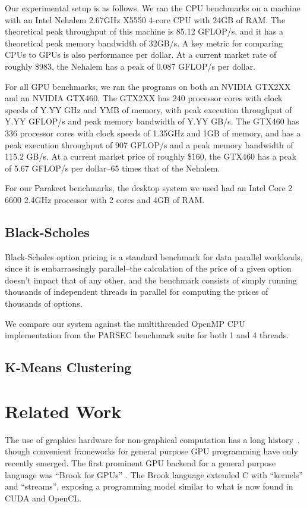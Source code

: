 \documentclass[preprint]{sigplanconf}
\begin{document}
Our experimental setup is as follows.  We ran the CPU benchmarks on a machine
with an Intel Nehalem 2.67GHz X5550 4-core CPU with 24GB of RAM.  The
theoretical peak throughput of this machine is 85.12 GFLOP/s, and it has a
theoretical peak memory bandwidth of 32GB/s.  A key metric for comparing CPUs
to GPUs is also performance per dollar.  At a current market rate of roughly
\$983, the Nehalem has a peak of 0.087 GFLOP/s per dollar.

For all GPU benchmarks, we ran the programs on both an NVIDIA GTX2XX and an
NVIDIA GTX460.  The GTX2XX has 240 processor cores with clock speeds of
Y.YY GHz and YMB of memory, with peak execution throughput of Y.YY GFLOP/s and
peak memory bandwidth of Y.YY GB/s.  The GTX460 has 336 processor cores with
clock speeds of 1.35GHz and 1GB of memory, and has a peak execution throughput
of 907 GFLOP/s and a peak memory bandwidth of 115.2 GB/s.  At a current market
price of roughly \$160, the GTX460 has a peak of 5.67 GFLOP/s per dollar--65
times that of the Nehalem.

For our Parakeet benchmarks, the desktop system we used had an Intel Core 2 6600
2.4GHz processor with 2 cores and 4GB of RAM.

\subsection{Black-Scholes}
Black-Scholes option pricing \cite{Blac73} is a standard benchmark for data
parallel workloads, since it is embarrassingly parallel--the calculation of the
price of a given option doesn't impact that of any other, and the benchmark
consists of simply running thousands of independent threads in parallel for
computing the prices of thousands of options.

We compare our system against the multithreaded OpenMP CPU implementation
from the PARSEC \cite{Bien08} benchmark suite for both 1 and 4 threads.

\subsection{K-Means Clustering}


\section{Related Work}
\label{RelatedWork}
The use of graphics hardware for non-graphical computation has a  long
history~\cite{Lengyel90}, though convenient frameworks for general purpose GPU
programming have only recently emerged. The first prominent GPU backend for a
general purpose language was ``Brook for GPUs'' \cite{Buck04}. The Brook
language extended C with ``kernels'' and
``streams'', exposing a programming model similar to what is now found in CUDA
and OpenCL.
\end{document}
